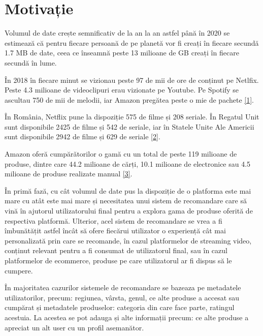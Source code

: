 \section{Motivație}

Volumul de date crește semnificativ de la an la an astfel până în 2020 se estimează că pentru fiecare persoană de pe planetă vor fi creați în fiecare secundă 1.7 MB de date, ceea ce înseamnă peste 13 milioane de GB creați în fiecare secundă în lume.

În 2018 în fiecare minut se vizionau peste 97 de mii de ore de conținut pe Netlfix. Peste 4.3 milioane de videoclipuri erau vizionate pe Youtube. Pe Spotify se ascultau 750 de mii de melodii, iar Amazon pregătea peste o mie de pachete \hyperlink{domo}{[1]}.

\vspace{5mm}

În România, Netflix pune la dispoziție 575 de filme și 208 seriale. În Regatul Unit sunt disponibile 2425 de filme și 542 de seriale, iar în Statele Unite Ale Americii sunt disponibile 2942 de filme și 629 de seriale \hyperlink{finder}{[2]}.

Amazon oferă cumpărătorilor o gamă cu un total de peste 119 milioane de produse, dintre care 44.2 milioane de cărți, 10.1 milioane de electronice sau 4.5 milioane de produse realizate manual \hyperlink{scrapehero}{[3]}.

\vspace{5mm}

În primă fază, cu cât volumul de date pus la dispoziție de o platforma este mai mare cu atât este mai mare și necesitatea unui sistem de recomandare care să vină în ajutorul utilizatorului final pentru a explora gama de produse oferită de respectiva platformă. Ulterior, acel sistem de recomandare se vrea a fi îmbunătățit astfel încât să ofere fiecărui utilizator o experiență cât mai personalizată prin care se recomande, în cazul platformelor de streaming video, conținut relevant pentru a fi consumat de utilizatorul final, sau în cazul platformelor de ecommerce, produse pe care utilizatorul ar fi dispus să le cumpere.

\vspace{5mm}

În majoritatea cazurilor sistemele de recomandare se bazeaza pe metadatele utilizatorilor, precum: regiunea, vârsta, genul, ce alte produse a accesat sau cumpărat și metadatele produselor: categoria din care face parte, ratingul acestuia. La acestea se pot adauga și alte informații precum: ce alte produse a apreciat un alt user cu un profil asemanător.


